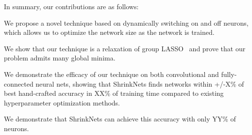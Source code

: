 
In summary, our contributions are as follows: 
\begin{compactenum}
\item We propose a novel technique based on dynamically switching on and off neurons, 
which allows us to optimize the network size as the network is trained. 
\item {}
\item We show that our technique is a relaxation of group LASSO~\cite{Yuan2006} and prove that our problem admits many global minima.
\item {}
\item We demonstrate the efficacy of our technique on both convolutional and fully-connected neural nets,
showing that 
ShrinkNets finds networks within +/-X\% of best hand-crafted accuracy in XX\% of
training time compared to existing hyperparameter optimization methods. 
\item We demonstrate that ShrinkNets can achieve this accuracy with only YY\% 
of neurons. 
\item {}
\item {}
\item {}
\end{compactenum}

